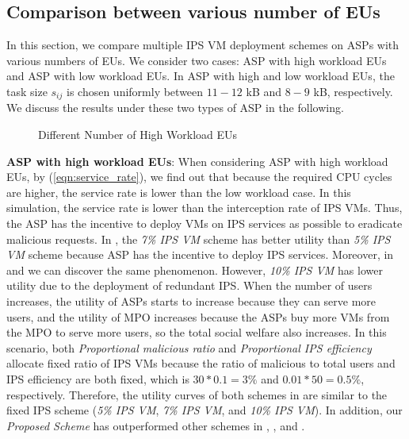 \documentclass[10pt,journal, compsoc]{IEEEtran}
\begin{document}
\subsection{Comparison between various number of EUs}
In this section, we compare multiple IPS VM deployment schemes on ASPs with various numbers of EUs. We consider two cases: ASP with high workload EUs and ASP with low workload EUs. In ASP with high and low workload EUs, the task size $s_{ij}$ is chosen uniformly between $11 - 12$ kB and $8 - 9$ kB, respectively. We discuss the results under these two types of ASP in the following. 
\begin{figure}[!]
\captionsetup{justification=centering}
  \hfill
  \hfill
\label{fig:num_cmp_high}
\caption{Different Number of High Workload EUs}
\end{figure}

\textbf{ASP with high workload EUs}: 
When considering ASP with high workload EUs, by (\ref{eqn:service_rate}), we find out that because the required CPU cycles are higher, the service rate is lower than the low workload case. In this simulation, the service rate is lower than the interception rate of IPS VMs. Thus, the ASP has the incentive to deploy VMs on IPS services as possible to eradicate malicious requests. In , the \textit{7\% IPS VM} scheme has better utility than \textit{5\% IPS VM} scheme because ASP has the incentive to deploy IPS services. Moreover, in  and  we can discover the same phenomenon. However, \textit{10\% IPS VM} has lower utility due to the deployment of redundant IPS. When the number of users increases, the utility of ASPs starts to increase because they can serve more users, and the utility of MPO increases because the ASPs buy more VMs from the MPO to serve more users, so the total social welfare also increases. In this scenario, both \textit{Proportional malicious ratio} and \textit{Proportional IPS efficiency} allocate fixed ratio of IPS VMs because the ratio of malicious to total users and IPS efficiency are both fixed, which is $30 * 0.1 = 3\%$ and $0.01 * 50 = 0.5\%$, respectively. Therefore, the utility curves of both schemes in  are similar to the fixed IPS scheme (\textit{5\% IPS VM}, \textit{7\% IPS VM}, and \textit{10\% IPS VM}). In addition, our \textit{Proposed Scheme} has outperformed other schemes in , , and .
\end{document}

